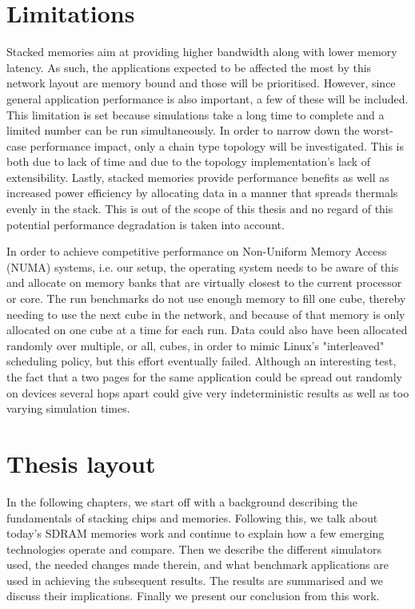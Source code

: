 \section{Limitations}
Stacked memories aim at providing higher bandwidth along with lower memory latency. As such, the applications expected to be affected the most by this network layout are memory bound and those will be prioritised. However, since general application performance is also important, a few of these will be included. This limitation is set because simulations take a long time to complete and a limited number can be run simultaneously. In order to narrow down the worst-case performance impact, only a chain type topology will be investigated. This is both due to lack of time and due to the topology implementation's lack of extensibility. Lastly, stacked memories provide performance benefits as well as increased power efficiency by allocating data in a manner that spreads thermals evenly in the stack. This is out of the scope of this thesis and no regard of this potential performance degradation is taken into account.
\bigskip

In order to achieve competitive performance on Non-Uniform Memory Access (NUMA) systems, i.e. our setup, the operating system needs to be aware of this and allocate on memory banks that are virtually closest to the current processor or core. The run benchmarks do not use enough memory to fill one cube, thereby needing to use the next cube in the network, and because of that memory is only allocated on one cube at a time for each run. Data could also have been allocated randomly over multiple, or all, cubes, in order to mimic Linux's "interleaved" scheduling policy, but this effort eventually failed. Although an interesting test, the fact that a two pages for the same application could be spread out randomly on devices several hops apart could give very indeterministic results as well as too varying simulation times.
\bigskip

\section{Thesis layout}
In the following chapters, we start off with a background describing the fundamentals of stacking chips and memories. Following this, we talk about today's SDRAM memories work and continue to explain how a few emerging technologies operate and compare. Then we describe the different simulators used, the needed changes made therein, and what benchmark applications are used in achieving the subsequent results. The results are summarised and we discuss their implications. Finally we present our conclusion from this work.